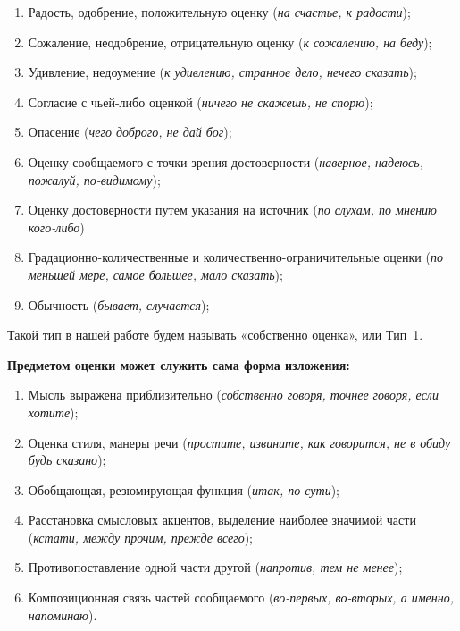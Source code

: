\documentclass{kursa4}
\begin{document}
{      %
      \begin{enumerate}
        \item Радость, одобрение, положительную оценку (\textit{на счастье, к
        радости});
        \item Сожаление, неодобрение, отрицательную оценку (\textit{к сожалению,
        на беду});
        \item Удивление, недоумение (\textit{к удивлению, странное дело, нечего
        сказать});
        \item Согласие с чьей-либо оценкой (\textit{ничего не скажешь, не
        спорю});
        \item Опасение (\textit{чего доброго, не дай бог});
        \item Оценку сообщаемого с точки зрения достоверности (\textit{наверное,
        надеюсь, пожалуй, по-видимому});
        \item Оценку достоверности путем указания на источник (\textit{по
        слухам, по мнению кого-либо})
        \item Градационно-количественные и количественно-ограничительные оценки
        (\textit{по меньшей мере, самое большее, мало сказать});
        \item Обычность (\textit{бывает, случается});
      \end{enumerate}

      Такой тип в нашей работе будем называть «собственно оценка», или Тип~1. 

      \textbf{Предметом оценки может служить сама форма изложения:}
      \begin{enumerate}
        \item Мысль выражена приблизительно (\textit{собственно говоря, точнее
        говоря, если хотите});
        \item Оценка стиля, манеры речи (\textit{простите, извините, как
        говорится, не в обиду будь сказано});
        \item Обобщающая, резюмирующая функция (\textit{итак, по сути});
        \item Расстановка смысловых акцентов, выделение наиболее значимой части
        (\textit{кстати, между прочим, прежде всего});
        \item Противопоставление одной части другой (\textit{напротив, тем не
        менее});
        \item Композиционная связь частей сообщаемого (\textit{во-первых, во-вторых, а именно, напоминаю}).
      \end{enumerate}

}
\end{document}
